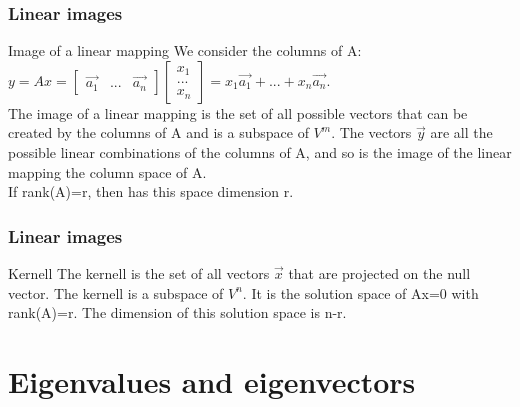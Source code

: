 \begin{frame}
	\frametitle{Linear images}
	\begin{block}{Image of a linear mapping}
		We consider the columns of A: $y=Ax=\begin{bmatrix}
		\overrightarrow{a_1} & ... & \overrightarrow{a_n}
		\end{bmatrix}\begin{bmatrix}
		x_1\\...\\x_n
		\end{bmatrix}=x_1\overrightarrow{a_1}+...+x_n\overrightarrow{a_n}$.\\
		The image of a linear mapping is the set of all possible vectors that can be created by the columns of A and is a subspace of $V^m$. The vectors $\overrightarrow{y}$ are all the possible linear combinations of the columns of A, and so is the image of the linear mapping the column space of A. \\
		If rank(A)=r, then has this space dimension r.
	\end{block}
\end{frame}

\begin{frame}
	\frametitle{Linear images}
	\begin{block}{Kernell}
		The kernell is the set of all vectors $\overrightarrow{x}$ that are projected on the null vector. The kernell is a subspace of $V^n$. It is the solution space of Ax=0 with rank(A)=r. The dimension of this solution space is n-r.\vspace{4mm}
	\end{block}
\end{frame}

\section{Eigenvalues and eigenvectors}

